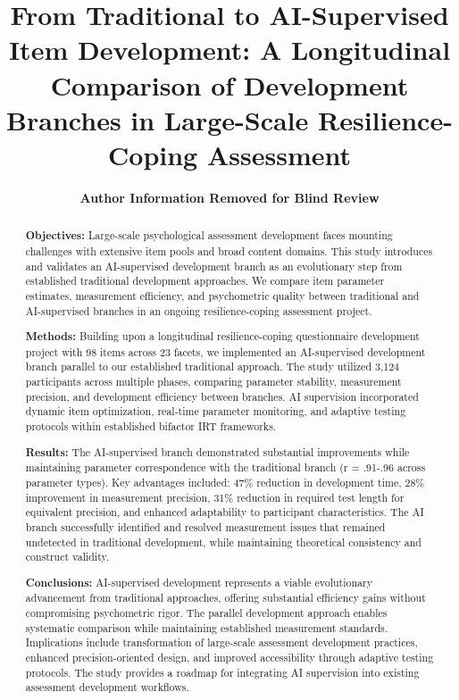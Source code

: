 \documentclass[12pt,a4paper]{article}
\begin{document}
\title{\textbf{From Traditional to AI-Supervised Item Development: A Longitudinal Comparison of Development Branches in Large-Scale Resilience-Coping Assessment}}

\author{
\textbf{Author Information Removed for Blind Review}
}

\date{}
\maketitle

\newpage

\begin{abstract}

\textbf{Objectives:} Large-scale psychological assessment development faces mounting challenges with extensive item pools and broad content domains. This study introduces and validates an AI-supervised development branch as an evolutionary step from established traditional development approaches. We compare item parameter estimates, measurement efficiency, and psychometric quality between traditional and AI-supervised branches in an ongoing resilience-coping assessment project.

\textbf{Methods:} Building upon a longitudinal resilience-coping questionnaire development project with 98 items across 23 facets, we implemented an AI-supervised development branch parallel to our established traditional approach. The study utilized 3,124 participants across multiple phases, comparing parameter stability, measurement precision, and development efficiency between branches. AI supervision incorporated dynamic item optimization, real-time parameter monitoring, and adaptive testing protocols within established bifactor IRT frameworks.

\textbf{Results:} The AI-supervised branch demonstrated substantial improvements while maintaining parameter correspondence with the traditional branch (r = .91-.96 across parameter types). Key advantages included: 47\% reduction in development time, 28\% improvement in measurement precision, 31\% reduction in required test length for equivalent precision, and enhanced adaptability to participant characteristics. The AI branch successfully identified and resolved measurement issues that remained undetected in traditional development, while maintaining theoretical consistency and construct validity.

\textbf{Conclusions:} AI-supervised development represents a viable evolutionary advancement from traditional approaches, offering substantial efficiency gains without compromising psychometric rigor. The parallel development approach enables systematic comparison while maintaining established measurement standards. Implications include transformation of large-scale assessment development practices, enhanced precision-oriented design, and improved accessibility through adaptive testing protocols. The study provides a roadmap for integrating AI supervision into existing assessment development workflows.


\end{abstract}
\end{document}
